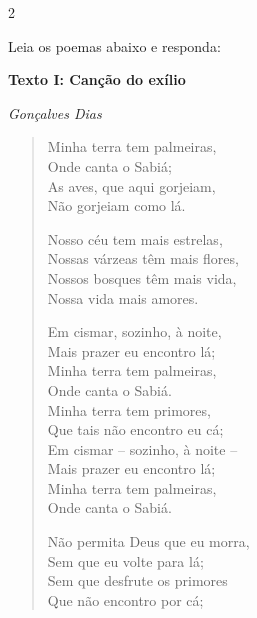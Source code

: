 {\num{2}

Leia os poemas abaixo e responda:

\textbf{Texto I: Canção do exílio}

\emph{Gonçalves Dias}

\begin{verse}

Minha terra tem palmeiras, \\

Onde canta o Sabiá; \\

As aves, que aqui gorjeiam, \\

Não gorjeiam como lá. 


Nosso céu tem mais estrelas,\\

Nossas várzeas têm mais flores, \\

Nossos bosques têm mais vida, \\

Nossa vida mais amores.


Em cismar, sozinho, à noite, \\

Mais prazer eu encontro lá; \\

Minha terra tem palmeiras, \\

Onde canta o Sabiá. \\


Minha terra tem primores, \\

Que tais não encontro eu cá; \\

Em cismar -- sozinho, à noite -- \\

Mais prazer eu encontro lá; \\

Minha terra tem palmeiras, \\

Onde canta o Sabiá. 


Não permita Deus que eu morra, \\

Sem que eu volte para lá; \\

Sem que desfrute os primores \\

Que não encontro por cá; \\


\end{verse}}
